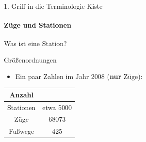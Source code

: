 \begin{frame}{1. Griff in die Terminologie-Kiste}
	\framesubtitle{Züge und Stationen}

	\begin{block}{}
		Was ist eine Station?
	\end{block}
	
	\begin{center}
	\end{center}
\end{frame}


\begin{frame}{Größenordnungen}
	\begin{itemize}
		\item Ein paar Zahlen im Jahr 2008 (\textbf{nur} Züge):
	\end{itemize}

	\vspace{3em}
	\begin{center}
		\begin{tabular}{ c|c } 
			Anzahl & \\
 			\hline
 			Stationen & etwa\texttrademark{} 5000 \\
 			Züge & 68073 \\ 
 			Fußwege & 425 \\
		\end{tabular}
	\end{center}
\end{frame}


